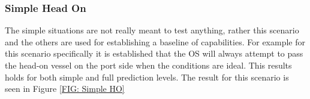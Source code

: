 
\clearpage
\subsubsection{Simple Head On}
The simple situations are not really meant to test anything, rather this scenario and the others are used for establishing
a baseline of capabilities. For example for this scenario specifically it is established that the OS will always attempt to
pass the head-on vessel on the port side when the conditions are ideal. This results holds for both simple and
full prediction levels. The result for this scenario is seen in Figure \ref{FIG: Simple HO}

